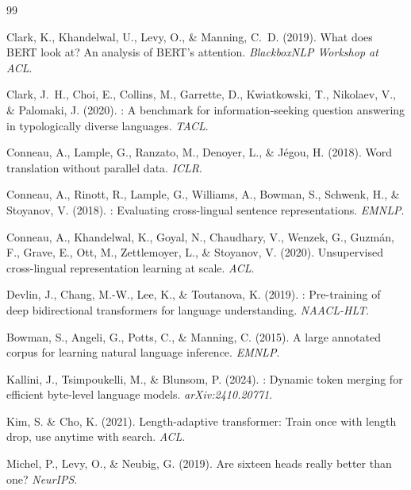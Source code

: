 \documentclass[11pt,a4paper]{article}
\begin{document}
\begin{thebibliography}{99}

Clark, K., Khandelwal, U., Levy, O., \& Manning, C.~D. (2019).
\newblock What does {BERT} look at? {A}n analysis of {BERT}'s attention.
\newblock \emph{BlackboxNLP Workshop at ACL}.

Clark, J.~H., Choi, E., Collins, M., Garrette, D., Kwiatkowski, T., Nikolaev, V., \& Palomaki, J. (2020).
: A benchmark for information-seeking question answering in typologically diverse languages.
\newblock \emph{TACL}.

Conneau, A., Lample, G., Ranzato, M., Denoyer, L., \& J\'{e}gou, H. (2018).
\newblock Word translation without parallel data.
\newblock \emph{ICLR}.

Conneau, A., Rinott, R., Lample, G., Williams, A., Bowman, S., Schwenk, H., \& Stoyanov, V. (2018).
: Evaluating cross-lingual sentence representations.
\newblock \emph{EMNLP}.

Conneau, A., Khandelwal, K., Goyal, N., Chaudhary, V., Wenzek, G., Guzm\'{a}n, F., Grave, E., Ott, M., Zettlemoyer, L., \& Stoyanov, V. (2020).
\newblock Unsupervised cross-lingual representation learning at scale.
\newblock \emph{ACL}.

Devlin, J., Chang, M.-W., Lee, K., \& Toutanova, K. (2019).
: Pre-training of deep bidirectional transformers for language understanding.
\newblock \emph{NAACL-HLT}.

Bowman, S., Angeli, G., Potts, C., \& Manning, C. (2015).
\newblock A large annotated corpus for learning natural language inference.
\newblock \emph{EMNLP}.

Kallini, J., Tsimpoukelli, M., \& Blunsom, P. (2024).
: Dynamic token merging for efficient byte-level language models.
\newblock \emph{arXiv:2410.20771}.

Kim, S. \& Cho, K. (2021).
\newblock Length-adaptive transformer: Train once with length drop, use anytime with search.
\newblock \emph{ACL}.

Michel, P., Levy, O., \& Neubig, G. (2019).
\newblock Are sixteen heads really better than one?
\newblock \emph{NeurIPS}.


\end{thebibliography}
\end{document}
